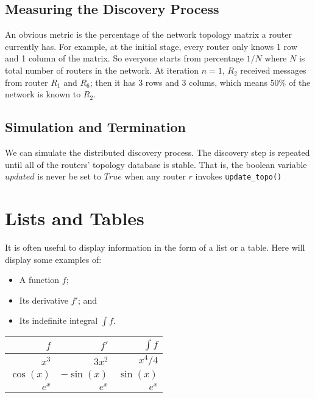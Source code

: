 \documentclass[12pt]{article}  %
\theoremstyle{definition}
\theoremstyle{remark}
\begin{document}
\subsection{Measuring the Discovery Process}
An obvious metric is the percentage of the network topology matrix a router currently has.
For example, at the initial stage, every router only knows 1 row and 1 column of the matrix.
So everyone starts from percentage $1/N$ where $N$ is total number of routers in the network.
At iteration $n=1$, $R_2$ received messages from router $R_1$ and $R_6$; then it has 3 rows and 3 colums, which means 50\% of the network is known to $R_2$.

\subsection{Simulation and Termination}
We can simulate the distributed discovery process.
The discovery step is repeated until all of the routers' topology database is stable.
That is, the boolean variable $updated$ is never be set to $True$ when any router $r$ invokes \texttt{update\_topo()}


%
%
%
%
%

\section{Lists and Tables}

It is often useful to display information in the form of a list or a table.
Here will display some examples of:

\begin{itemize}
\item A function $f$;
\item Its derivative $f'$; and
\item Its indefinite integral $\int f$.
\end{itemize}

\begin{center}              %
\begin{tabular}{|r|r|r|}    %
\hline                      %
$f$ & $f'$ & $\int f$ \\    %
\hline
$x^3$ & $3x^2$ & $x^4/4$ \\
$\cos(x)$ & $-\sin(x)$ & $\sin(x)$ \\
$e^x$ & $e^x$ & $e^x$\\
\hline
\end{tabular}               %
\end{center}                %
\end{document}
